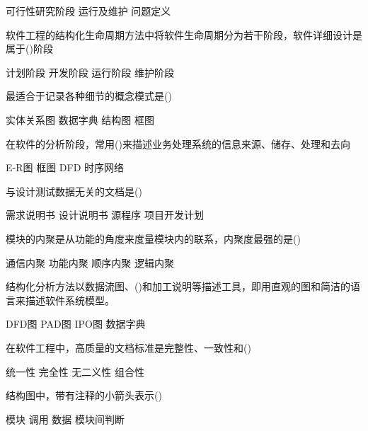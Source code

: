 \documentclass[answers]{exam}
\begin{document}
\begin{questions}
\begin{oneparchoices}
		\choice 可行性研究阶段
		\correctchoice 运行及维护
		\choice 问题定义
	\end{oneparchoices}
	\question 软件工程的结构化生命周期方法中将软件生命周期分为若干阶段，软件详细设计是属于()阶段\\
	\begin{oneparchoices}
		\choice 计划阶段
		\correctchoice 开发阶段
		\choice 运行阶段
		\choice 维护阶段
	\end{oneparchoices}
	\question 最适合于记录各种细节的概念模式是()\\
	\begin{oneparchoices}
		\choice 实体关系图
		\correctchoice 数据字典
		\choice 结构图
		\choice 框图
	\end{oneparchoices}
	\question 在软件的分析阶段，常用()来描述业务处理系统的信息来源、储存、处理和去向\\
	\begin{oneparchoices}
		\choice E-R图
		\choice 框图
		\correctchoice DFD
		\choice 时序网络
	\end{oneparchoices}
	\question 与设计测试数据无关的文档是()\\
	\begin{oneparchoices}
		\choice 需求说明书
		\choice 设计说明书
		\choice 源程序
		\correctchoice 项目开发计划
	\end{oneparchoices}
	\question 模块的内聚是从功能的角度来度量模块内的联系，内聚度最强的是()\\
	\begin{oneparchoices}
		\choice 通信内聚
		\correctchoice 功能内聚
		\choice 顺序内聚
		\choice 逻辑内聚
	\end{oneparchoices}
	\question 结构化分析方法以数据流图、()和加工说明等描述工具，即用直观的图和简洁的语言来描述软件系统模型。\\
	\begin{oneparchoices}
		\choice DFD图
		\choice PAD图
		\choice IPO图
		\correctchoice 数据字典
	\end{oneparchoices}
	\question 在软件工程中，高质量的文档标准是完整性、一致性和()\\
	\begin{oneparchoices}
		\choice 统一性
		\choice 完全性
		\correctchoice 无二义性
		\choice 组合性
	\end{oneparchoices}
	\question 结构图中，带有注释的小箭头表示()\\
	\begin{oneparchoices}
		\choice 模块
		\correctchoice 调用
		\choice 数据
		\choice 模块间判断
	\end{oneparchoices}

\end{questions}
\end{document}
